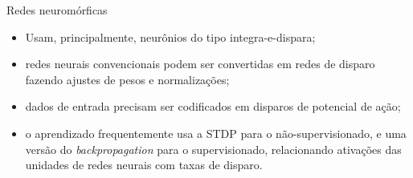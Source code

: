 \begin{frame}{Redes neuromórficas}
	\begin{itemize}
		\item Usam, principalmente, neurônios do tipo integra-e-dispara;
		\item redes neurais convencionais podem ser convertidas em redes de disparo fazendo ajustes de pesos e normalizações;
		\item dados de entrada precisam ser codificados em disparos de potencial de ação;
		\item o aprendizado frequentemente usa a STDP para o não-supervisionado, e uma versão do \textit{backpropagation} para o supervisionado, relacionando ativações das unidades de redes neurais com taxas de disparo.
		\\
	\end{itemize}
\end{frame}
